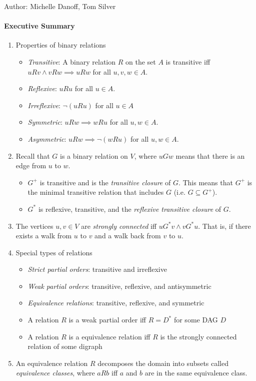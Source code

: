 \documentclass[solution, letterpaper]{cs20inclass}
\begin{document}

\noindent Author: Michelle Danoff, Tom Silver%

\paragraph*{Executive Summary}
\begin{enumerate}
\item Properties of binary relations
\begin{itemize}
\item \textit{Transitive}: A binary relation $R$ on the set $A$ is transitive iff\\$u R v \wedge v R w \implies u R w$ for all $u,v,w \in A$.
\item \textit{Reflexive}: $u R u$ for all $u \in A$.
\item \textit{Irreflexive}: $\neg(uRu)$ for all $u \in A$
\item \textit{Symmetric}: $u R w \implies w R u$ for all $u,w \in A$.
\item \textit{Asymmetric}: $u R w \implies \neg(wRu)$ for all $u, w \in A$.
\end{itemize}
\item Recall that $G$ is a binary relation on $V$, where $uGw$ means that there is an edge from $u$ to $w$.
\begin{itemize}
\item $G^+$ is transitive and is the \textit{transitive closure} of $G$. This means that $G^+$ is the minimal transitive relation that includes $G$ (i.e. $G \subseteq G^+$).
\item $G^*$ is reflexive, transitive, and the \textit{reflexive transitive closure} of $G$.
\end{itemize}
\item The vertices $u,v \in V$ are \textit{strongly connected} iff $uG^*v \wedge vG^*u$. That is, if there exists a walk from $u$ to $v$ and a walk back from $v$ to $u$.
\item Special types of relations
\begin{itemize}
\item \textit{Strict partial orders}: transitive and irreflexive
\item \textit{Weak partial orders}: transitive, reflexive, and antisymmetric
\item \textit{Equivalence relations}: transitive, reflexive, and symmetric
\item A relation $R$ is a weak partial order iff $R = D^*$ for some DAG $D$
\item A relation $R$ is a equivalence relation iff $R$ is the strongly connected relation of some digraph
\end{itemize}
\item An equivalence relation $R$ decomposes the domain into subsets called \textit{equivalence classes}, where $aRb$ iff $a$ and $b$ are in the same equivalence class.
\end{enumerate}
\end{document}
